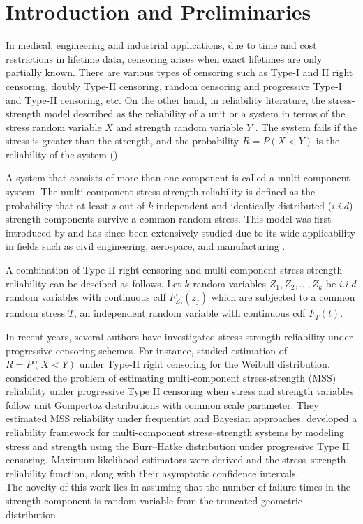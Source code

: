 \documentclass[twoside]{article}
\begin{document}
\section{\bf Introduction and Preliminaries}\label{section1}
In medical, engineering and industrial applications, due to time and cost restrictions in lifetime data, censoring arises when exact lifetimes are only partially known. There are various types of censoring such as Type-I and II right censoring, doubly Type-II censoring, random censoring and progressive Type-I and Type-II censoring, etc. On the other hand, in reliability literature, the stress-strength model described as the reliability of a unit or a system in terms of the stress random variable $X$ and strength random variable $Y$ . The system fails if the stress is greater than the strength, and the probability $R = P(X < Y )$ is the reliability of the system (\cite{Kotz2003}).

A system that consists of more than one component is called a multi-component system. The multi-component stress-strength reliability is defined as the probability that at least $s$ out of $k$ independent and identically distributed ($i.i.d$) strength components survive a common random stress. This model was first introduced by \cite{BhattacharyyaJohnson1974} and has since been extensively studied due to its wide applicability in fields such as civil engineering, aerospace, and manufacturing \cite{Rao2013}.

A combination of Type-II right censoring and multi-component stress-strength reliability can be descibed as follows. Let $k$ random variables $Z_1,Z_2,\ldots,Z_k$ be $i.i.d$  random variables with continuous cdf $F_{Z_j}(z_j)$ which are subjected to a common random stress $T$, an independent random variable with continuous cdf $F_T (t)$.

In recent years, several authors have investigated stress-strength reliability under progressive censoring schemes. For instance, \cite{Asgharzadeh2017} studied estimation of $R=P(X<Y)$ under  Type-II right  censoring for the Weibull distribution. 
\cite{Jha2020} considered the problem of estimating multi-component stress-strength (MSS) reliability under progressive Type II censoring when stress and strength variables follow unit Gompertoz distributions with common scale parameter. They estimated MSS reliability under frequentist and Bayesian approaches.
\cite{El-Desokey2026} developed a reliability framework for multi-component stress–strength systems by modeling stress and strength using the Burr–Hatke distribution under progressive Type II censoring. Maximum likelihood estimators were derived and the stress–strength reliability function, along with their asymptotic confidence intervals.\\
The novelty of this work lies in assuming that the number of failure times in the strength component is random variable from the truncated geometric distribution. 
\end{document}
